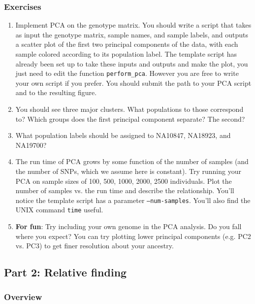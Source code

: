 \documentclass[12pt]{article}
\begin{document}
\subsubsection*{Exercises}
\begin{enumerate}
\item
Implement PCA on the genotype matrix. You should write a script that takes as input the genotype matrix, sample names, and sample labels, and outputs a scatter plot of the first two principal components of the data, with each sample colored according to its population label. The template script has already been set up to take these inputs and outputs and make the plot, you just need to edit the function \texttt{perform\_pca}. However you are free to write your own script if you prefer. You should submit the path to your PCA script and to the resulting figure.

\item
You should see three major clusters. What populations to those correspond to? Which groups does the first principal component separate? The second?

\item
What population labels should be assigned to NA10847, NA18923, and NA19700?

\item
The run time of PCA grows by some function of the number of samples (and the number of SNPs, which we assume here is constant). Try running your PCA on sample sizes of 100, 500, 1000, 2000, 2500 individuals. Plot the number of samples vs. the run time and describe the relationship. You'll notice the template script has a parameter \texttt{--num-samples}. You'll also find the UNIX command \texttt{time} useful.

\item \textbf{For fun}: Try including your own genome in the PCA analysis. Do you fall where you expect? You can try plotting lower principal components (e.g. PC2 vs. PC3) to get finer resolution about your ancestry. 

\end{enumerate}


\subsection*{Part 2: Relative finding}

\subsubsection*{Overview}
\end{document}
